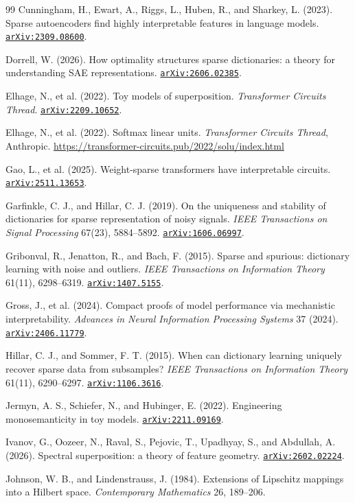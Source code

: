 \documentclass[11pt]{amsart}
\newcommand{\arxiv}[1]{\href{https://arxiv.org/abs/#1}{\texttt{arXiv:#1}}}
\theoremstyle{plain}
\theoremstyle{definition}
\begin{document}
\begin{thebibliography}{99}
 Cunningham, H., Ewart, A., Riggs, L., Huben, R., and Sharkey, L. (2023). Sparse autoencoders find highly interpretable features in language models. \arxiv{2309.08600}.

 Dorrell, W. (2026). How optimality structures sparse dictionaries: a theory for understanding SAE representations. \arxiv{2606.02385}.

 Elhage, N., et al. (2022). Toy models of superposition. \emph{Transformer Circuits Thread}. \arxiv{2209.10652}.

 Elhage, N., et al. (2022). Softmax linear units. \emph{Transformer Circuits Thread}, Anthropic. \url{https://transformer-circuits.pub/2022/solu/index.html}

 Gao, L., et al. (2025). Weight-sparse transformers have interpretable circuits. \arxiv{2511.13653}.

 Garfinkle, C. J., and Hillar, C. J. (2019). On the uniqueness and stability of dictionaries for sparse representation of noisy signals. \emph{IEEE Transactions on Signal Processing} 67(23), 5884--5892. \arxiv{1606.06997}.

 Gribonval, R., Jenatton, R., and Bach, F. (2015). Sparse and spurious: dictionary learning with noise and outliers. \emph{IEEE Transactions on Information Theory} 61(11), 6298--6319. \arxiv{1407.5155}.

 Gross, J., et al. (2024). Compact proofs of model performance via mechanistic interpretability. \emph{Advances in Neural Information Processing Systems} 37 (2024). \arxiv{2406.11779}.

 Hillar, C. J., and Sommer, F. T. (2015). When can dictionary learning uniquely recover sparse data from subsamples? \emph{IEEE Transactions on Information Theory} 61(11), 6290--6297. \arxiv{1106.3616}.

 Jermyn, A. S., Schiefer, N., and Hubinger, E. (2022). Engineering monosemanticity in toy models. \arxiv{2211.09169}.

 Ivanov, G., Oozeer, N., Raval, S., Pejovic, T., Upadhyay, S., and Abdullah, A. (2026). Spectral superposition: a theory of feature geometry. \arxiv{2602.02224}.

 Johnson, W. B., and Lindenstrauss, J. (1984). Extensions of Lipschitz mappings into a Hilbert space. \emph{Contemporary Mathematics} 26, 189--206.


\end{thebibliography}
\end{document}
